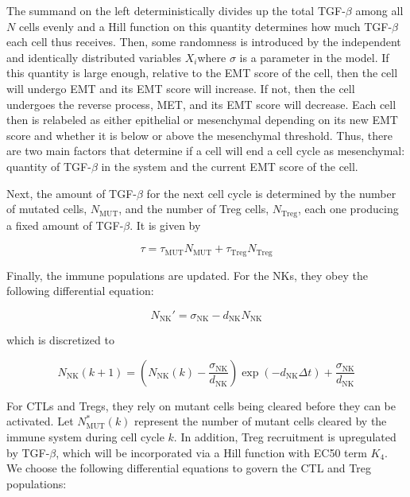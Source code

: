 \documentclass[11pt]{article}
\begin{document}
The summand on the left deterministically divides up the total TGF-$\beta$ among all $N$ cells evenly and a Hill function on this quantity determines how much TGF-$\beta$ each cell thus receives.
Then, some randomness is introduced by the independent and identically distributed variables $X_i$where $\sigma$ is a parameter in the model.
If this quantity is large enough, relative to the EMT score of the cell, then the cell will undergo EMT and its EMT score will increase.
If not, then the cell undergoes the reverse process, MET, and its EMT score will decrease.
Each cell then is relabeled as either epithelial or mesenchymal depending on its new EMT score and whether it is below or above the mesenchymal threshold.
Thus, there are two main factors that determine if a cell will end a cell cycle as mesenchymal: quantity of TGF-$\beta$ in the system and the current EMT score of the cell.

Next, the amount of TGF-$\beta$ for the next cell cycle is determined by the number of mutated cells, $N_{\text{MUT}}$, and the number of Treg cells, $N_{\text{Treg}}$, each one producing a fixed amount of TGF-$\beta$. It is given by

\begin{equation}\tag{2.6}
\tau = \tau_{\text{MUT}}N_{\text{MUT}} + \tau_{\text{Treg}}N_{\text{Treg}}
\end{equation}


Finally, the immune populations are updated.
For the NKs, they obey the following differential equation:
 
\begin{equation}\tag{2.7}
N_{\text{NK}}' = \sigma_{\text{NK}} - d_{\text{NK}}N_{\text{NK}}
\end{equation}

which is discretized to
 
 \begin{equation}\tag{2.8}
N_{\text{NK}}(k+1) = \left (N_{\text{NK}}(k)-\frac{\sigma_{\text{NK}}}{d_{\text{NK}}} \right )\exp(-d_{\text{NK}}\Delta t)+\frac{\sigma_{\text{NK}}}{d_{\text{NK}}}
\end{equation}

For CTLs and Tregs, they rely on mutant cells being cleared before they can be activated.
Let $N_{\text{MUT}}^*(k)$ represent the number of mutant cells cleared by the immune system during cell cycle $k$.
In addition, Treg recruitment is upregulated by TGF-$\beta$, which will be incorporated via a Hill function with EC50 term $K_4$.
We choose the following differential equations to govern the CTL and Treg populations:
\end{document}
